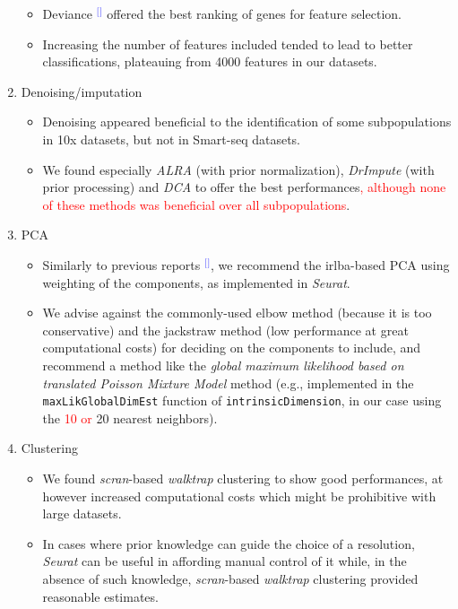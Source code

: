 \documentclass[11pt]{article}
\renewcommand{\cite}[1]{\textcolor{Blue}{$^[$\supercite{#1}$^]$}}
\begin{document}
\begin{enumerate}
   \begin{itemize}
     \item Deviance \cite{townesGlmpca2019} offered the best ranking of genes for feature selection.
     \item Increasing the number of features included tended to lead to better classifications, plateauing from 4000 features in our datasets.
   \end{itemize}
   \item Denoising/imputation
   \begin{itemize}
       \item Denoising appeared beneficial to the identification of some subpopulations in 10x datasets, but not in Smart-seq datasets.
       \item We found especially \textit{ALRA} (with prior normalization), \textit{DrImpute} (with prior processing) and \textit{DCA} to offer the best performances\textcolor{red}{, although none of these methods was beneficial over all subpopulations}.
   \end{itemize}
   \item PCA
   \begin{itemize}
     \item Similarly to previous reports \cite{SunDimRed2019}, we recommend the irlba-based PCA using weighting of the components, as implemented in \textit{Seurat}. 
     \item We advise against the commonly-used elbow method (because it is too conservative) and the jackstraw method (low performance at great computational costs) for deciding on the components to include, and recommend a method like the \textit{global maximum likelihood based on translated Poisson Mixture Model} method (e.g., implemented in the  \texttt{maxLikGlobalDimEst} function of \texttt{intrinsicDimension}, in our case using the \textcolor{red}{10 or }20 nearest neighbors).
   \end{itemize}
   \item Clustering
   \begin{itemize}
    \item We found \textit{scran}-based \textit{walktrap} clustering to show good performances, at however increased computational costs which might be prohibitive with large datasets.
    \item In cases where prior knowledge can guide the choice of a resolution, \textit{Seurat} can be useful in affording manual control of it while, in the absence of such knowledge, \textit{scran}-based \textit{walktrap} clustering provided reasonable estimates.
   \end{itemize}
\end{enumerate}
\end{document}
